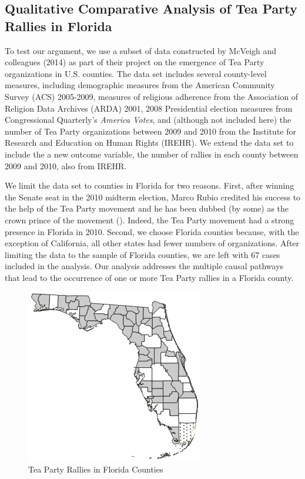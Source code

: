 \documentclass[]{article}
\begin{document}
\subsection{Qualitative Comparative Analysis of Tea Party Rallies in Florida}


To test our argument, we use a subset of data constructed by McVeigh and colleagues (2014) as part of their project on the emergence of Tea Party organizations in U.S. counties. The data set includes several county-level measures, including demographic measures from the American Community Survey (ACS) 2005-2009, measures of religious adherence from the Association of Religion Data Archives (ARDA) 2001, 2008 Presidential election measures from Congressional Quarterly's {\it{America Votes}}, and (although not included here) the number of Tea Party organizations between 2009 and 2010 from the Institute for Research and Education on Human Rights (IREHR). We extend the data set to include the a new outcome variable, the number of rallies in each county between 2009 and 2010, also from IREHR. 

We limit the data set to counties in Florida for two reasons. First, after winning the Senate seat in the 2010 midterm election, Marco Rubio credited his success to the help of the Tea Party movement and he has been dubbed (by some) as the crown prince of the movement (). Indeed, the Tea Party movement had a strong presence in Florida in 2010. Second, we choose Florida counties because, with the exception of California, all other states had fewer numbers of organizations. After limiting the data to the sample of Florida counties, we are left with 67 cases included in the analysis. Our analysis addresses the multiple causal pathways that lead to the occurrence of one or more Tea Party rallies in a Florida county.

\begin{figure}[htb!]
	\begin{center}
	\includegraphics[scale=.75]{Plots/florida_rallies_cropped.png} %
	\end{center}
\caption{Tea Party Rallies in Florida Counties}
\label{diagram}
\end{figure}
\end{document}
